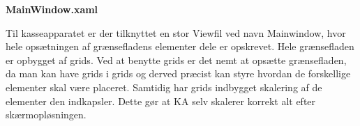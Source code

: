 \textbf{MainWindow.xaml}

Til kasseapparatet er der tilknyttet en stor Viewfil ved navn Mainwindow, hvor hele opsætningen af grænsefladens elementer dele er opskrevet. Hele grænsefladen er opbygget af grids. Ved at benytte grids er det nemt at opsætte grænsefladen, da man kan have grids i grids og derved præcist kan styre hvordan de forskellige elementer skal være placeret. Samtidig har grids indbygget skalering af de elementer den indkapsler. Dette gør at \gls{KA} selv skalerer korrekt alt efter skærmopløsningen.